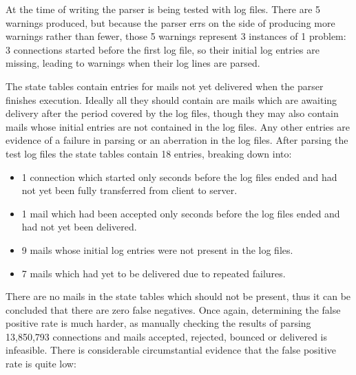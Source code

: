 At the time of writing the parser is being tested with \numberOFlogFILES{}
log files.  There are 5 warnings produced, but because the parser errs on
the side of producing more warnings rather than fewer, those 5 warnings
represent 3 instances of 1 problem: 3 connections started before the first
log file, so their initial log entries are missing, leading to warnings
when their log lines are parsed.

The state tables contain entries for mails not yet delivered when the
parser finishes execution.  Ideally all they should contain are mails which
are awaiting delivery after the period covered by the log files, though
they may also contain mails whose initial entries are not contained in the
log files.  Any other entries are evidence of a failure in parsing or an
aberration in the log files.  After parsing the \numberOFlogFILES{} test
log files the state tables contain 18 entries, breaking down into:

\begin{itemize}

    \item 1 connection which started only seconds before the log files
        ended and had not yet been fully transferred from client to server.

    \item 1 mail which had been accepted only seconds before the log files
        ended and had not yet been delivered.

    \item 9 mails whose initial log entries were not present in the log
        files.

    \item 7 mails which had yet to be delivered due to repeated failures.

\end{itemize}

There are no mails in the state tables which should not be present, thus it
can be concluded that there are zero false negatives.  Once again,
determining the false positive rate is much harder, as manually checking
the results of parsing 13,850,793 connections and mails accepted, rejected,
bounced or delivered is infeasible.  There is considerable circumstantial
evidence that the false positive rate is quite low:

